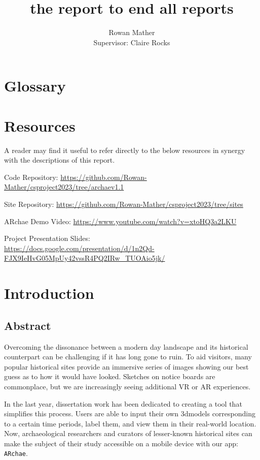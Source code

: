 \documentclass{article}
\title{the report to end all reports}
\author{Rowan Mather \\
Supervisor: Claire Rocks}
\date{\parbox{\linewidth}{\centering%
  March 2024 \endgraf\medskip \hspace{1cm} Keywords: Graphics, Unity, Augmented Reality, Education, Mobile, GPS} }
\begin{document}
\maketitle

\tableofcontents

\section{Glossary}

\printglossary

\section{Resources}
A reader may find it useful to refer directly to the below resources in synergy with the descriptions of this report.

Code Repository: \url{https://github.com/Rowan-Mather/csproject2023/tree/archaev1.1} \cite{tools:repo}

Site Repository: \url{https://github.com/Rowan-Mather/csproject2023/tree/sites} \cite{tools:repo}

ARchae Demo Video: \url{https://www.youtube.com/watch?v=xtoHQ3a2LKU} \cite{design:videodemo}

Project Presentation Slides: \\
\url{https://docs.google.com/presentation/d/1n2Qd-FJX9IeHvG05MpUy42vssR4PQ2IRw_TUOAio5jk/}

\section{Introduction}

\subsection{Abstract}
Overcoming the dissonance between a modern day landscape and its historical counterpart can be challenging if it has long gone to ruin. To aid visitors, many popular historical sites provide an immersive series of images showing our best guess as to how it would have looked. Sketches on notice boards are commonplace, but we are increasingly seeing additional \gls{VR} or \gls{AR} experiences. 

In the last year, dissertation work has been dedicated 
to creating a tool that simplifies this process. Users are able to input their own \gls{3dmodel}s corresponding to a certain time periods, label them, and view them in their real-world location. Now, archaeological researchers and curators of lesser-known historical sites can make the subject of their study accessible on a mobile device with our app: 
\verb|ARchae|. 
\end{document}
